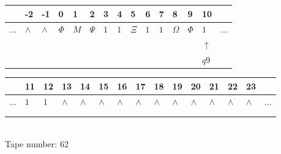 \documentclass[11pt]{article}
\begin{document}
\begin{table}[H]
\centering
\begin{tabular}{lllllllllllllll}
 & -2 & -1 & 0 & 1 & 2 & 3 & 4 & 5 & 6 & 7 & 8 & 9 & 10 & \\
\hline
$...$ & \multicolumn{1}{|l|}{$\wedge$} & \multicolumn{1}{|l|}{$\wedge$} & \multicolumn{1}{|l|}{$\Phi$} & \multicolumn{1}{|l|}{$M$} & \multicolumn{1}{|l|}{$\Psi$} & \multicolumn{1}{|l|}{$1$} & \multicolumn{1}{|l|}{$1$} & \multicolumn{1}{|l|}{$\Xi$} & \multicolumn{1}{|l|}{$1$} & \multicolumn{1}{|l|}{$1$} & \multicolumn{1}{|l|}{$\Omega$} & \multicolumn{1}{|l|}{$\Phi$} & \multicolumn{1}{|l|}{$1$} & $...$\\
\hline
&  &  &  &  &  &  &  &  &  &  &  &  & $\uparrow$ &  \\
&  &  &  &  &  &  &  &  &  &  &  &  & $ q9 $ &  \\
\end{tabular}
\begin{tabular}{lllllllllllllll}
 & 11 & 12 & 13 & 14 & 15 & 16 & 17 & 18 & 19 & 20 & 21 & 22 & 23 & \\
\hline
$...$ & \multicolumn{1}{|l|}{$1$} & \multicolumn{1}{|l|}{$1$} & \multicolumn{1}{|l|}{$\wedge$} & \multicolumn{1}{|l|}{$\wedge$} & \multicolumn{1}{|l|}{$\wedge$} & \multicolumn{1}{|l|}{$\wedge$} & \multicolumn{1}{|l|}{$\wedge$} & \multicolumn{1}{|l|}{$\wedge$} & \multicolumn{1}{|l|}{$\wedge$} & \multicolumn{1}{|l|}{$\wedge$} & \multicolumn{1}{|l|}{$\wedge$} & \multicolumn{1}{|l|}{$\wedge$} & \multicolumn{1}{|l|}{$\wedge$} & $...$\\
\hline
&  &  &  &  &  &  &  &  &  &  &  &  &  &  \\
&  &  &  &  &  &  &  &  &  &  &  &  &  &  \\
\end{tabular}
\\
Tape number: 62
\noindent\makebox[\linewidth]{\hdashrule{\textwidth}{1pt}{1pt}}\end{table}
\end{document}
